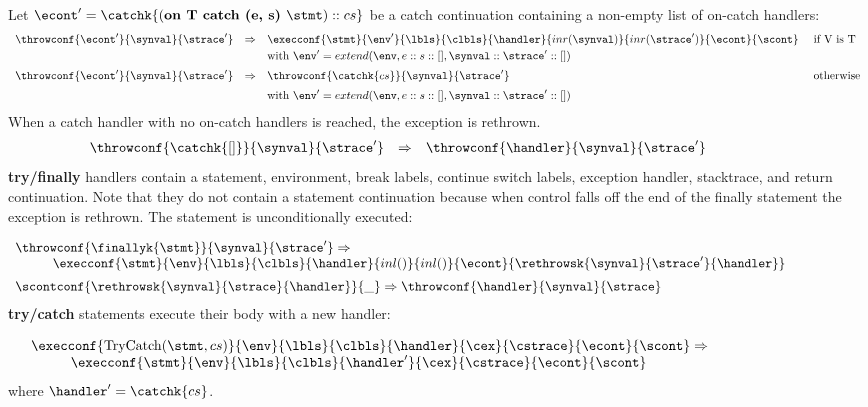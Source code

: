 \documentclass{article}
\begin{document}
\noindent
Let $\econt' = \catchk{(\textbf{on T catch (e, s) }\stmt) :: cs}$ be a catch continuation containing a non-empty list of on-catch handlers:
\[
  \begin{array}{lcll}
	\throwconf{\econt'}{\synval}{\strace'}
	& \Rightarrow &
	\execconf{\stmt}{\env'}{\lbls}{\clbls}{\handler}{inr(\synval)}{inr(\strace')}{\econt}{\scont}
	&\textrm{ if V is T}\\[1mm]

	&&\textrm{with } \env' = extend(\env, e :: s :: [], \synval :: \strace' :: [])\\[2mm]

	\throwconf{\econt'}{\synval}{\strace'}
	& \Rightarrow &
	\throwconf{\catchk{cs}}{\synval}{\strace'}	&\textrm{ otherwise}\\[2mm]
	&&\textrm{with } \env' = extend(\env, e :: s :: [], \synval :: \strace' :: [])
  \end{array}
\]
\noindent
When a catch handler with no on-catch handlers is reached, the exception is rethrown.
\[
  \begin{array}{lcll}
	\throwconf{\catchk{[]}}{\synval}{\strace'}
	& \Rightarrow &
	\throwconf{\handler}{\synval}{\strace'}\hspace{20mm}
  \end{array}
\]
\noindent
\textbf{try/finally} handlers contain a statement, environment, break labels, continue switch labels, exception handler, stacktrace, and return continuation. Note that they do not contain a statement continuation because when control falls off the end of the finally statement the exception is rethrown. The statement is unconditionally executed:

\[
  \begin{array}{lcl}
	\throwconf{\finallyk{\stmt}}{\synval}{\strace'}
	\Rightarrow \\
	\hspace{10mm}\execconf{\stmt}{\env}{\lbls}{\clbls}{\handler}{inl()}{inl()}{\econt}{\rethrowsk{\synval}{\strace'}{\handler}}\hspace{20mm}\\[2mm]

	\scontconf{\rethrowsk{\synval}{\strace}{\handler}}{\_}
	\Rightarrow \throwconf{\handler}{\synval}{\strace}

  \end{array}
\]
\noindent
\textbf{try/catch} statements execute their body with a new handler:

\[
  \begin{array}{lcl}
	\execconf{\mathrm{TryCatch}(\stmt, cs)}{\env}{\lbls}{\clbls}{\handler}{\cex}{\cstrace}{\econt}{\scont}
	\Rightarrow\\
	\hspace{10mm}\execconf{\stmt}{\env}{\lbls}{\clbls}{\handler'}{\cex}{\cstrace}{\econt}
	{\scont}\hspace{50mm}
  \end{array}
\]
where $\handler' = \catchk{cs}$.
\end{document}
